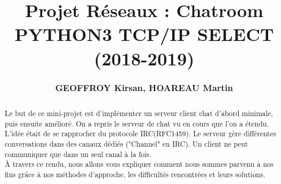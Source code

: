\documentclass[12pt]{article}
\title{\textbf{Projet Réseaux : Chatroom\\PYTHON3 TCP/IP SELECT\\ (2018-2019)}}
\author{\textbf{GEOFFROY Kirsan, HOAREAU Martin}}
\begin{document}
\maketitle

\tableofcontents

\begin{abstract}
    Le but de ce mini-projet est d'implémenter un serveur client chat d'abord minimale, puis ensuite amélioré. 
    On a repris le serveur de chat vu en cours que l'on a étendu. L'idée était de se rapprocher du protocole IRC(RFC1459). 
    Le serveur gère différentes conversations dans des canaux dédiés ("Channel" en IRC). Un client ne peut communiquer que dans un seul canal à la fois.\\ 
    À travers ce rendu, nous allons vous expliquer comment nous sommes parvenu à nos fins grâce à nos méthodes d'approche, les difficultés rencontrées et leurs solutions.
\end{abstract}
\end{document}
